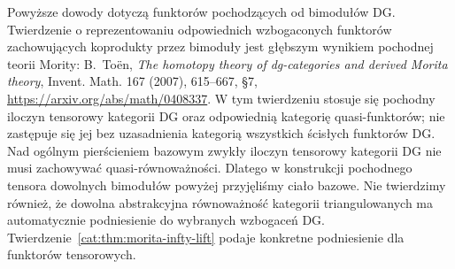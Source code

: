 \begin{uwaga}\label{cat:rem:morita-scope}
Powyższe dowody dotyczą funktorów pochodzących od bimodułów DG. Twierdzenie o reprezentowaniu odpowiednich wzbogaconych funktorów zachowujących koprodukty przez bimoduły jest głębszym wynikiem pochodnej teorii Mority: B.~Toën, \emph{The homotopy theory of dg-categories and derived Morita theory}, Invent. Math. 167 (2007), 615--667, \S7, \url{https://arxiv.org/abs/math/0408337}. W tym twierdzeniu stosuje się pochodny iloczyn tensorowy kategorii DG oraz odpowiednią kategorię quasi-funktorów; nie zastępuje się jej bez uzasadnienia kategorią wszystkich ścisłych funktorów DG. Nad ogólnym pierścieniem bazowym zwykły iloczyn tensorowy kategorii DG nie musi zachowywać quasi-równoważności. Dlatego w konstrukcji pochodnego tensora dowolnych bimodułów powyżej przyjęliśmy ciało bazowe. Nie twierdzimy również, że dowolna abstrakcyjna równoważność kategorii triangulowanych ma automatycznie podniesienie do wybranych wzbogaceń DG. Twierdzenie~\ref{cat:thm:morita-infty-lift} podaje konkretne podniesienie dla funktorów tensorowych.
\end{uwaga}

